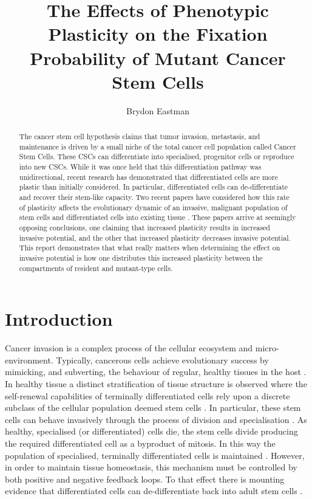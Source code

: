 \documentclass[12pt]{article}
\title{%
The Effects of Phenotypic Plasticity on the Fixation Probability of Mutant Cancer Stem Cells}
\author{Brydon Eastman}
\begin{document}
\maketitle
\begin{abstract}
The cancer stem cell hypothesis claims that tumor invasion, metastasis, and maintenance is driven by a small niche of the total cancer cell population called Cancer Stem Cells. These CSCs can differentiate into specialised, progenitor cells or reproduce into new CSCs. While it was once held that this differentiation pathway was unidirectional, recent research has demonstrated that differentiated cells are more plastic than initially considered. In particular, differentiated cells can de-differentiate and recover their stem-like capacity. Two recent papers have considered how this rate of plasticity affects the evolutionary dynamic of an invasive, malignant population of stem cells and differentiated cells into existing tissue \cite{mohammad, wodarz}. These papers arrive at seemingly opposing conclusions, one claiming that increased plasticity results in increased invasive potential, and the other that increased plasticity decreases invasive potential. This report demonstrates that what really matters when determining the effect on invasive potential is how one distributes this increased plasticity between the compartments of resident and mutant-type cells.
\end{abstract}
\section{Introduction}
Cancer invasion is a complex process of the cellular ecosystem and micro-environment. Typically, cancerous cells achieve evolutionary success by mimicking, and subverting, the behaviour of regular, healthy tissues in the host \cite{moh1}. In healthy tissue a distinct stratification of tissue structure is observed where the self-renewal capabilities of terminally differentiated cells rely upon a discrete subclass of the cellular population deemed stem cells \cite{weis2000}. In particular, these stem cells can behave invasively through the process of division and specialisation \cite{moh2}. As healthy, specialised (or differentiated) cells die, the stem cells divide producing the required differentiated cell as a byproduct of mitosis. In this way the population of specialised, terminally differentiated cells is maintained \cite{moh2, watt2000}. However, in order to maintain tissue homeostasis, this mechanism must be controlled by both positive and negative feedback loops. To that effect there is mounting evidence that differentiated cells can de-differentiate back into adult stem cells \cite{watt2000}.
\end{document}
